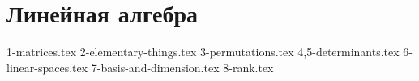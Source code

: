 \section{Линейная алгебра}
{1-matrices.tex}
{2-elementary-things.tex}
{3-permutations.tex}
{4,5-determinants.tex}
{6-linear-spaces.tex}
{7-basis-and-dimension.tex}
{8-rank.tex}
